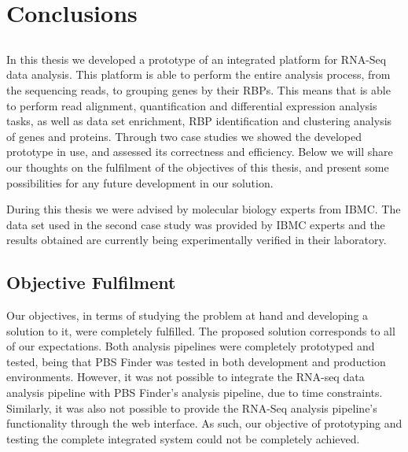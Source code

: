 \chapter{Conclusions} \label{chap:conclusions}

\section*{}


In this thesis we developed a prototype of an integrated platform for RNA-Seq
data analysis. This platform is able to perform the entire analysis process,
from the sequencing reads, to grouping genes by their RBPs. This means that is
able to perform read alignment, quantification and differential expression
analysis tasks, as well as data set enrichment, RBP identification and
clustering analysis of genes and proteins. Through two case studies we showed
the developed prototype in use, and assessed its correctness and efficiency.
Below we will share our thoughts on the fulfilment of the objectives of this
thesis, and present some possibilities for any future development in our
solution.

During this thesis we were advised by molecular biology experts from IBMC. The
data set used in the second case study was provided by IBMC experts and the
results obtained are currently being experimentally verified in their
laboratory.

\section{Objective Fulfilment}

Our objectives, in terms of studying the problem at hand and developing a
solution to it, were completely fulfilled. The proposed solution corresponds to
all of our expectations. Both analysis pipelines were completely prototyped and
tested, being that PBS Finder was tested in both development and production
environments. However, it was not possible to integrate the RNA-seq data
analysis pipeline with PBS Finder's analysis pipeline, due to time constraints.
Similarly, it was also not possible to provide the RNA-Seq analysis pipeline's
functionality through the web interface. As such, our objective of prototyping
and testing the complete integrated system could not be completely achieved.

